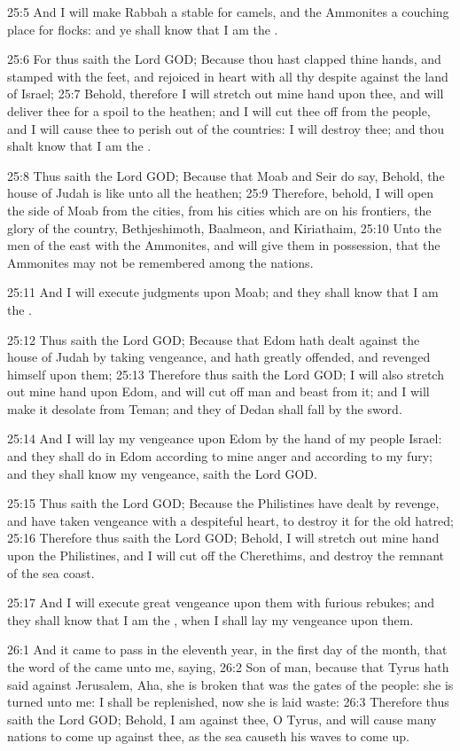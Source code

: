 25:5 And I will make Rabbah a stable for camels, and the Ammonites a
couching place for flocks: and ye shall know that I am the \LORD.

25:6 For thus saith the Lord GOD; Because thou hast clapped thine
hands, and stamped with the feet, and rejoiced in heart with all thy
despite against the land of Israel; 25:7 Behold, therefore I will
stretch out mine hand upon thee, and will deliver thee for a spoil to
the heathen; and I will cut thee off from the people, and I will cause
thee to perish out of the countries: I will destroy thee; and thou
shalt know that I am the \LORD.

25:8 Thus saith the Lord GOD; Because that Moab and Seir do say,
Behold, the house of Judah is like unto all the heathen; 25:9
Therefore, behold, I will open the side of Moab from the cities, from
his cities which are on his frontiers, the glory of the country,
Bethjeshimoth, Baalmeon, and Kiriathaim, 25:10 Unto the men of the
east with the Ammonites, and will give them in possession, that the
Ammonites may not be remembered among the nations.

25:11 And I will execute judgments upon Moab; and they shall know that
I am the \LORD.

25:12 Thus saith the Lord GOD; Because that Edom hath dealt against
the house of Judah by taking vengeance, and hath greatly offended, and
revenged himself upon them; 25:13 Therefore thus saith the Lord GOD; I
will also stretch out mine hand upon Edom, and will cut off man and
beast from it; and I will make it desolate from Teman; and they of
Dedan shall fall by the sword.

25:14 And I will lay my vengeance upon Edom by the hand of my people
Israel: and they shall do in Edom according to mine anger and
according to my fury; and they shall know my vengeance, saith the Lord
GOD.

25:15 Thus saith the Lord GOD; Because the Philistines have dealt by
revenge, and have taken vengeance with a despiteful heart, to destroy
it for the old hatred; 25:16 Therefore thus saith the Lord GOD;
Behold, I will stretch out mine hand upon the Philistines, and I will
cut off the Cherethims, and destroy the remnant of the sea coast.

25:17 And I will execute great vengeance upon them with furious
rebukes; and they shall know that I am the \LORD, when I shall lay my
vengeance upon them.

26:1 And it came to pass in the eleventh year, in the first day of the
month, that the word of the \LORD came unto me, saying, 26:2 Son of
man, because that Tyrus hath said against Jerusalem, Aha, she is
broken that was the gates of the people: she is turned unto me: I
shall be replenished, now she is laid waste: 26:3 Therefore thus saith
the Lord GOD; Behold, I am against thee, O Tyrus, and will cause many
nations to come up against thee, as the sea causeth his waves to come
up.

